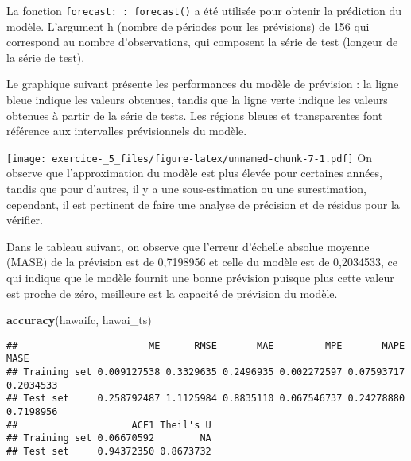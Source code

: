\documentclass[
]{article}
\newenvironment{Shaded}{\begin{snugshade}}{\end{snugshade}}
\newcommand{\DataTypeTok}[1]{\textcolor[rgb]{0.13,0.29,0.53}{#1}}
\newcommand{\KeywordTok}[1]{\textcolor[rgb]{0.13,0.29,0.53}{\textbf{#1}}}
\newcommand{\NormalTok}[1]{#1}
\newcommand{\OperatorTok}[1]{\textcolor[rgb]{0.81,0.36,0.00}{\textbf{#1}}}
\newcommand{\StringTok}[1]{\textcolor[rgb]{0.31,0.60,0.02}{#1}}
\begin{document}
La fonction \texttt{forecast:\ :\ forecast()} a été utilisée pour
obtenir la prédiction du modèle. L'argument h (nombre de périodes pour
les prévisions) de 156 qui correspond au nombre d'observations, qui
composent la série de test (longeur de la série de test).

Le graphique suivant présente les performances du modèle de prévision :
la ligne bleue indique les valeurs obtenues, tandis que la ligne verte
indique les valeurs obtenues à partir de la série de tests. Les régions
bleues et transparentes font référence aux intervalles prévisionnels du
modèle.

\begin{Shaded}
\end{Shaded}

\texttt{[image: exercice-\_5\_files/figure-latex/unnamed-chunk-7-1.pdf]}
On observe que l'approximation du modèle est plus élevée pour certaines
années, tandis que pour d'autres, il y a une sous-estimation ou une
surestimation, cependant, il est pertinent de faire une analyse de
précision et de résidus pour la vérifier.

Dans le tableau suivant, on observe que l'erreur d'échelle absolue
moyenne (MASE) de la prévision est de 0,7198956 et celle du modèle est
de 0,2034533, ce qui indique que le modèle fournit une bonne prévision
puisque plus cette valeur est proche de zéro, meilleure est la capacité
de prévision du modèle.

\begin{Shaded}
\begin{Highlighting}[]
\KeywordTok{accuracy}\NormalTok{(hawaifc, hawai_ts)}
\end{Highlighting}
\end{Shaded}

\begin{verbatim}
##                       ME      RMSE       MAE         MPE       MAPE      MASE
## Training set 0.009127538 0.3329635 0.2496935 0.002272597 0.07593717 0.2034533
## Test set     0.258792487 1.1125984 0.8835110 0.067546737 0.24278880 0.7198956
##                    ACF1 Theil's U
## Training set 0.06670592        NA
## Test set     0.94372350 0.8673732
\end{verbatim}
\end{document}
